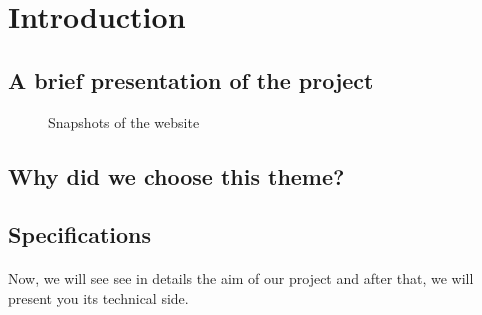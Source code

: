 \section{Introduction} %

\subsection{A brief presentation of the project}

\begin{figure}[!ht]
    \caption{Snapshots of the website}
\end{figure}

\subsection{Why did we choose this theme?}

\subsection{Specifications}

\paragraph{}
Now, we will see see in details the aim of our project and after that, we will present you its technical side.
